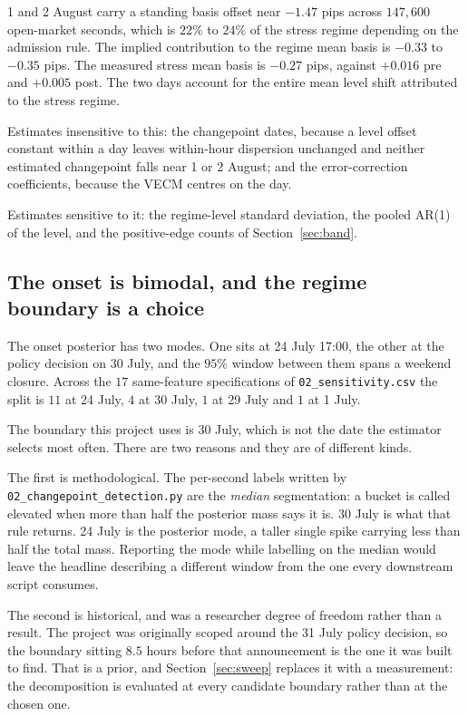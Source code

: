 \documentclass[11pt,a4paper]{article}
\newcommand{\code}[1]{\texttt{\small #1}}
\begin{document}
1 and 2 August carry a standing basis offset near $-1.47$ pips across $147{,}600$
open-market seconds, which is $22\%$ to $24\%$ of the stress regime depending on the
admission rule. The implied contribution to the regime mean basis is $-0.33$ to $-0.35$
pips. The measured stress mean basis is $-0.27$ pips, against $+0.016$ pre and $+0.005$
post. The two days account for the entire mean level shift attributed to the stress regime.

Estimates insensitive to this: the changepoint dates, because a level offset constant within
a day leaves within-hour dispersion unchanged and neither estimated changepoint falls near
1 or 2 August; and the error-correction coefficients, because the VECM centres on the day.

Estimates sensitive to it: the regime-level standard deviation, the pooled AR(1) of the
level, and the positive-edge counts of Section~\ref{sec:band}.

\subsection{The onset is bimodal, and the regime boundary is a choice}
\label{sec:onset}

The onset posterior has two modes. One sits at 24 July 17:00, the other at the policy
decision on 30 July, and the $95\%$ window between them spans a weekend closure. Across the
$17$ same-feature specifications of \code{02\_sensitivity.csv} the split is $11$ at 24 July,
$4$ at 30 July, $1$ at 29 July and $1$ at 1 July.

The boundary this project uses is 30 July, which is not the date the estimator selects most
often. There are two reasons and they are of different kinds.

The first is methodological. The per-second labels written by
\code{02\_changepoint\_detection.py} are the \emph{median} segmentation: a bucket is called
elevated when more than half the posterior mass says it is. 30 July is what that rule
returns. 24 July is the posterior mode, a taller single spike carrying less than half the
total mass. Reporting the mode while labelling on the median would leave the headline
describing a different window from the one every downstream script consumes.

The second is historical, and was a researcher degree of freedom rather than a result. The
project was originally scoped around the 31 July policy decision, so the boundary sitting
$8.5$ hours before that announcement is the one it was built to find. That is a prior, and
Section~\ref{sec:sweep} replaces it with a measurement: the decomposition is evaluated at
every candidate boundary rather than at the chosen one.
\end{document}
